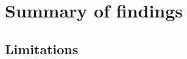 \section{Summary of findings}\label{sec:summary-of-findings}

\subsection{Limitations}\label{subsec:limitations}
